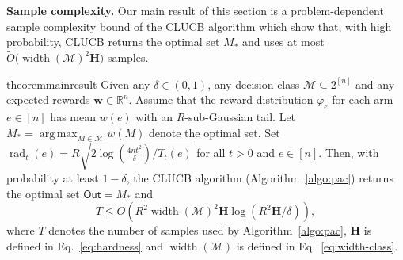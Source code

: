 \documentclass{article}
\newcommand{\junk}[1]{}
\newcommand{\Algorithm}{{\small \textsf{CLUCB}}\xspace}
\newcommand{\Rew}{\varphi}
\newcommand{\M}{\mathcal M}
\newcommand{\B}{\mathcal B}
\newcommand{\RR}{\mathbb R}
\DeclareMathOperator{\rank}{width}
\DeclareMathOperator{\rad}{rad}
\DeclareMathOperator*{\argmax}{arg\,max}
\newcommand{\out}{\mathsf{Out}}
\newcommand{\MultiIdent}{\textsc{TopK}\xspace}
\newcommand{\Matroid}{\textsc{Matroid}\xspace}
\newcommand{\Match}{\textsc{Match}\xspace}
\newcommand{\Path}{\textsc{Path}\xspace}
\renewcommand{\vec}[1]{\boldsymbol{#1}}
\begin{document}
\textbf{Sample complexity.} 
Our main result of this section is a problem-dependent sample complexity bound of the \Algorithm algorithm which show that, with high probability, \Algorithm returns the optimal set $M_*$ and uses at most $\tilde O\big(\rank(\M)^2 \mathbf H\big)$ samples.
\begin{restatable}{theorem}{mainresult}
Given any $\delta \in (0,1)$, any decision class $\M \subseteq 2^{[n]}$ and any expected rewards $\vec w \in \RR^{n}$.
Assume that the reward distribution $\Rew_e$ for each arm $e\in [n]$ has mean $w(e)$ with an $R$-sub-Gaussian tail.
Let $M_* = \argmax_{M\in \M} w(M)$ denote the optimal set.
Set $\rad_t(e) = R\sqrt{2\log\left(\frac{4n t^2}\delta\right)/ T_t(e) }$ for all $t > 0$ and $e\in[n]$.
Then, with probability at least $1-\delta$, the \Algorithm algorithm (Algorithm~\ref{algo:pac}) returns the optimal set $\out=M_*$ and
\begin{equation}
\label{eq:sample-complexity}
T \le O\left(R^2\rank(\M)^2\mathbf H\log\left(R^2 \mathbf H /\delta\right)\right),
\end{equation}
where $T$ denotes the number of samples used by Algorithm~\ref{algo:pac}, $\mathbf H$ is defined in Eq.~\eqref{eq:hardness} and $\rank(\M)$ is defined in Eq.~\eqref{eq:width-class}.
\label{theorem:main}
\end{restatable}
\junk{
By combining Lemma~\ref{lemma:example-exchange-class} and Theorem~\ref{theorem:main}, we can bound the sample complexity of \Algorithm for our running examples.
\begin{corollary}
\begin{itemize}
	\item \MultiIdent. $T \le O\big(\mathbf H \log(n\mathbf H/\delta)\big)$.
	\item \Matroid. $T \le O\big(\mathbf H \log(n\mathbf H/\delta)\big)$.
	\item \Match. $T \le O\big(|V|^2 \mathbf H \log(n |V|^2 \mathbf H/\delta)\big)$.
	\item \Path. $T \le O\big(|V|^2 \mathbf H \log(n |V|^2 \mathbf H/\delta)\big)$.
\end{itemize}
\end{corollary}
}


\vspace{-0.5em}
\end{document}
